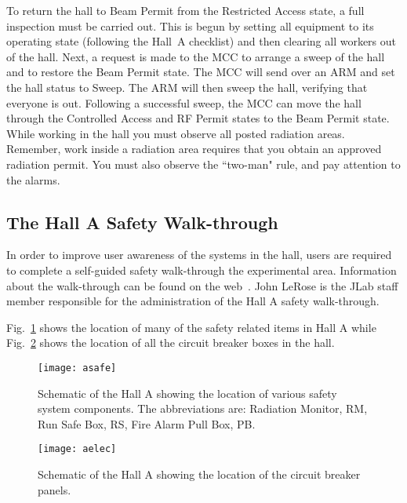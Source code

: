 To return the hall to Beam Permit from the Restricted Access state, a
full inspection must be carried out. This is begun by setting all
equipment to its operating state (following the Hall~A checklist) and
then clearing all workers out of the hall. Next, a request is made to
the MCC to arrange a sweep of the hall and to restore the Beam Permit
state. The MCC will send over an ARM and set the hall status to Sweep.
The ARM will then sweep the hall, verifying that everyone is
out. Following a successful sweep, the MCC can move the hall through
the Controlled Access and RF Permit states to the Beam Permit state.
While working in the hall you must observe all posted radiation areas.
Remember, work inside a radiation area requires that you obtain an
approved radiation permit. You must also observe the ``two-man" rule,
and pay attention to the alarms.

\begin{safetyen}{10}{10}
\subsection{The Hall A Safety Walk-through}
\end{safetyen}

In order to improve user awareness of the systems in the hall,
users are required to complete a self-guided safety walk-through
the experimental area. Information about the walk-through can be
found on the web~\cite{SAThalla}.
John LeRose is the JLab staff member responsible for the
administration of the Hall A safety walk-through.

Fig.~\ref{fig:asafe} shows the location of
many of the safety related items in Hall A while
Fig.~\ref{fig:aelec} shows the location of all the circuit
breaker boxes in the hall.

\begin{figure}
\begin{center}
\texttt{[image: asafe]}
{\linespread{1.}
\caption[Introduction: Location of Hall Safety Items ]{Schematic
of the Hall A showing the location of various safety system
components. The abbreviations are: Radiation Monitor, RM, Run
Safe Box, RS, Fire Alarm Pull Box, PB. }
\label{fig:asafe}}
\end{center}
\end{figure}

\begin{figure}
\begin{center}
\texttt{[image: aelec]}
{\linespread{1.}
\caption[Introduction: Location of Circuit Breakers]{Schematic of
the Hall A showing the location of the circuit breaker panels.}
\label{fig:aelec}}
\end{center}
\end{figure}

%
